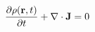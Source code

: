 \documentclass[preview]{standalone}
\begin{document}
\begin{align*}
\pdv{\rho(\textbf{r},t)}{t} + \nabla\cdot\textbf{J} = 0
\end{align*}
\end{document}
